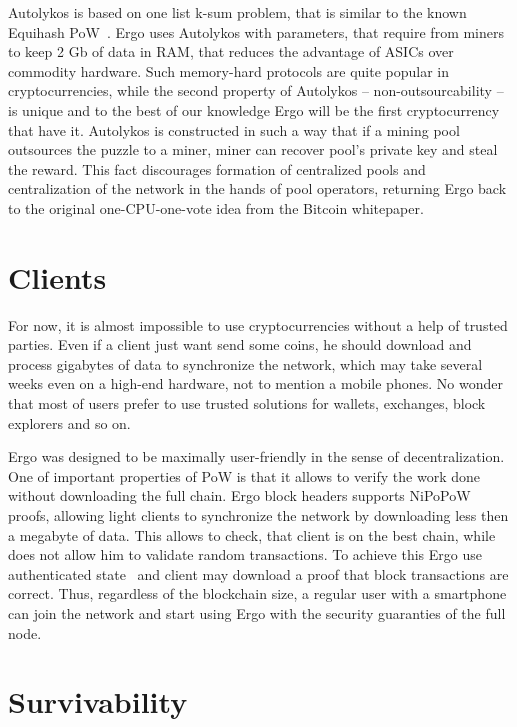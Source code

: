 \documentclass[]{article}
\begin{document}
    Autolykos is based on one list k-sum problem, that is similar to the known Equihash PoW~\cite{biryukov2017equihash}.
    Ergo uses Autolykos with parameters, that require from miners to keep 2 Gb of data in RAM,
    that reduces the advantage of ASICs over commodity hardware.
    Such memory-hard protocols are quite popular in cryptocurrencies, while the second property
    of Autolykos -- non-outsourcability -- is unique and to the best of our knowledge Ergo
    will be the first cryptocurrency that have it. Autolykos is constructed in such a way
    that if a mining pool outsources the puzzle to a miner, miner can recover pool's
    private key and steal the reward.
    This fact discourages formation of centralized pools and centralization of the
    network in the hands of pool operators, returning Ergo back to the original
    one-CPU-one-vote idea from the Bitcoin whitepaper.

    \section{Clients}

    For now, it is almost impossible to use cryptocurrencies without a help of trusted parties.
    Even if a client just want send some coins, he should download and process gigabytes of
    data to synchronize the network, which may take several weeks even on a high-end hardware,
    not to mention a mobile phones.
    No wonder that most of users prefer to use trusted solutions for wallets, exchanges, block
    explorers and so on.

    Ergo was designed to be maximally user-friendly in the sense of decentralization.
    One of important properties of PoW is that it allows to verify the work done without
    downloading the full chain.
    Ergo block headers supports NiPoPoW~\cite{kiayias2017non} proofs, allowing light clients
    to synchronize the network by downloading less then a megabyte of data.
    This allows to check, that client is on the best chain, while does not allow
    him to validate random transactions.
    To achieve this Ergo use authenticated state~\cite{reyzin2017improving} and client
    may download a proof that block transactions are correct.
    Thus, regardless of the blockchain size, a regular user with a smartphone can
    join the network and start using Ergo with the security guaranties of the full node.

    \section{Survivability}
\end{document}
